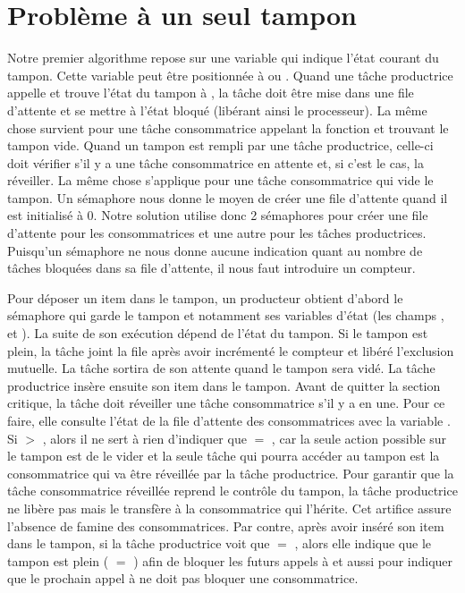 \section{Problème à un seul tampon}
Notre premier algorithme repose sur une variable qui indique l'état courant du tampon. Cette variable peut être positionnée à  ou .
Quand une tâche productrice appelle  et trouve l'état du tampon à , la tâche doit être mise dans une file d'attente et se mettre à l'état bloqué (libérant ainsi le processeur). La même chose survient pour une tâche consommatrice appelant la fonction  et trouvant le tampon vide. Quand un tampon est rempli par une tâche productrice, celle-ci doit vérifier s'il y a une tâche consommatrice en attente et, si c'est le cas, la réveiller. La même chose s'applique pour une tâche consommatrice qui vide le tampon.
Un sémaphore nous donne le moyen de créer une file d'attente quand il est initialisé à 0. Notre solution utilise donc 2 sémaphores pour créer une file d'attente pour les consommatrices et une autre pour les tâches productrices. Puisqu'un sémaphore ne nous donne aucune indication quant au nombre de tâches bloquées dans sa file d'attente, il nous faut introduire un compteur.

Pour déposer un item dans le tampon, un producteur obtient d'abord le sémaphore  qui garde le tampon et notamment ses variables d'état (les champs ,  et ).
La suite de son exécution dépend de l'état du tampon. Si le tampon est plein, la tâche joint la file  après avoir incrémenté le compteur  et libéré l'exclusion mutuelle. La tâche sortira de son attente quand le tampon sera vidé.
La tâche productrice insère ensuite son item dans le tampon. Avant de quitter la section critique, la tâche doit réveiller une tâche consommatrice s'il y a en une. Pour ce faire, elle consulte l'état de la file d'attente des consommatrices avec la variable . Si  $>$ , alors il ne sert à rien d'indiquer que  $=$ , car la seule action possible sur le tampon est de le vider et la seule tâche qui pourra accéder au tampon est la consommatrice qui va être réveillée par la tâche productrice. Pour garantir que la tâche consommatrice réveillée reprend le contrôle du tampon, la tâche productrice ne libère pas  mais le transfère à la consommatrice qui l'hérite. Cet artifice assure l'absence de famine des consommatrices.
Par contre, après avoir inséré son item dans le tampon, si la tâche productrice voit que  $=$ , alors elle indique que le tampon est plein ( $=$ ) afin de bloquer les futurs appels à  et aussi pour indiquer que le prochain appel à  ne doit pas bloquer une consommatrice.

